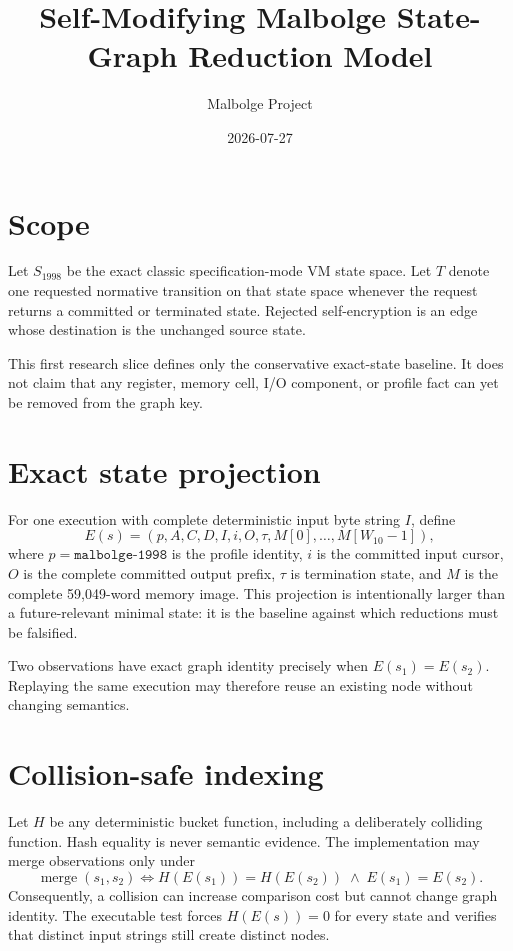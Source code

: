 \documentclass{article}
\title{Self-Modifying Malbolge State-Graph Reduction Model}
\author{Malbolge Project}
\date{2026{-}07{-}27}
\begin{document}
\maketitle

\section{Scope}

Let $S_{1998}$ be the exact classic specification-mode VM state space. Let $T$
denote one requested normative transition on that state space whenever the
request returns a committed or terminated state. Rejected self-encryption is an
edge whose destination is the unchanged source state.

This first research slice defines only the conservative exact-state baseline.
It does not claim that any register, memory cell, I/O component, or profile fact
can yet be removed from the graph key.

\section{Exact state projection}

For one execution with complete deterministic input byte string $I$, define
\begin{equation}
  E(s)=\left(
    p,A,C,D,I,i,O,\tau,M[0],\ldots,M[W_{10}-1]
  \right),
  \label{eq:state-graph-exact-key}
\end{equation}
where $p=\texttt{malbolge-1998}$ is the profile identity, $i$ is the committed
input cursor, $O$ is the complete committed output prefix, $\tau$ is termination
state, and $M$ is the complete 59,049-word memory image. This projection is
intentionally larger than a future-relevant minimal state: it is the baseline
against which reductions must be falsified.

Two observations have exact graph identity precisely when
$E(s_1)=E(s_2)$. Replaying the same execution may therefore reuse an existing
node without changing semantics.

\section{Collision-safe indexing}

Let $H$ be any deterministic bucket function, including a deliberately
colliding function. Hash equality is never semantic evidence. The implementation
may merge observations only under
\begin{equation}
  \operatorname{merge}(s_1,s_2)
    \Longleftrightarrow
    H(E(s_1))=H(E(s_2))\;\land\;E(s_1)=E(s_2).
  \label{eq:state-graph-collision-safe-merge}
\end{equation}
Consequently, a collision can increase comparison cost but cannot change graph
identity. The executable test forces $H(E(s))=0$ for every state and verifies
that distinct input strings still create distinct nodes.
\end{document}
